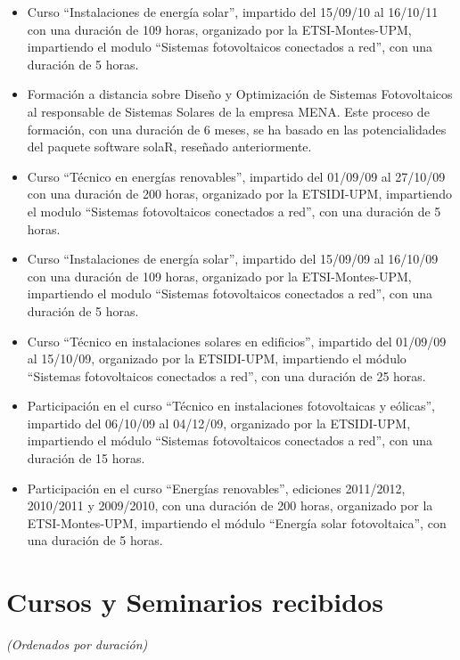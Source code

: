 \documentclass[article, a4paper]{memoir}
\begin{document}
\begin{itemize}
\item Curso ``Instalaciones de energía solar'', impartido del 15/09/10 al 16/10/11 con una duración de 109 horas, organizado por la ETSI-Montes-UPM, impartiendo el modulo ``Sistemas fotovoltaicos conectados a red'', con una duración de 5 horas.

\item Formación a distancia sobre Diseño y Optimización de Sistemas Fotovoltaicos al responsable de Sistemas Solares de la empresa MENA. Este proceso de formación, con una duración de 6 meses, se ha basado en las potencialidades del paquete software solaR, reseñado anteriormente.

\item Curso ``Técnico en energías renovables'', impartido del 01/09/09 al 27/10/09 con una duración de 200 horas, organizado por la ETSIDI-UPM, impartiendo el modulo ``Sistemas fotovoltaicos conectados a red'', con una duración de 5 horas.

\item Curso ``Instalaciones de energía solar'', impartido del 15/09/09 al 16/10/09 con una duración de 109 horas, organizado por la ETSI-Montes-UPM, impartiendo el modulo ``Sistemas fotovoltaicos conectados a red'', con una duración de 5 horas.

\item Curso ``Técnico en instalaciones solares en edificios'', impartido del 01/09/09 al 15/10/09, organizado por la ETSIDI-UPM, impartiendo el módulo ``Sistemas fotovoltaicos conectados a red'', con una duración de 25 horas.

\item Participación en el curso ``Técnico en instalaciones fotovoltaicas y eólicas'', impartido del 06/10/09 al 04/12/09, organizado por la ETSIDI-UPM, impartiendo el módulo ``Sistemas fotovoltaicos conectados a red'', con una duración de 15 horas.

\item Participación en el curso ``Energías renovables'', ediciones 2011/2012, 2010/2011 y 2009/2010, con una duración de 200 horas, organizado por la ETSI-Montes-UPM, impartiendo el módulo ``Energía solar fotovoltaica'', con una duración de 5 horas.
\end{itemize}

\section{Cursos y Seminarios recibidos}
\label{sec:orgc046693}
\emph{(Ordenados por duración)}
\end{document}
